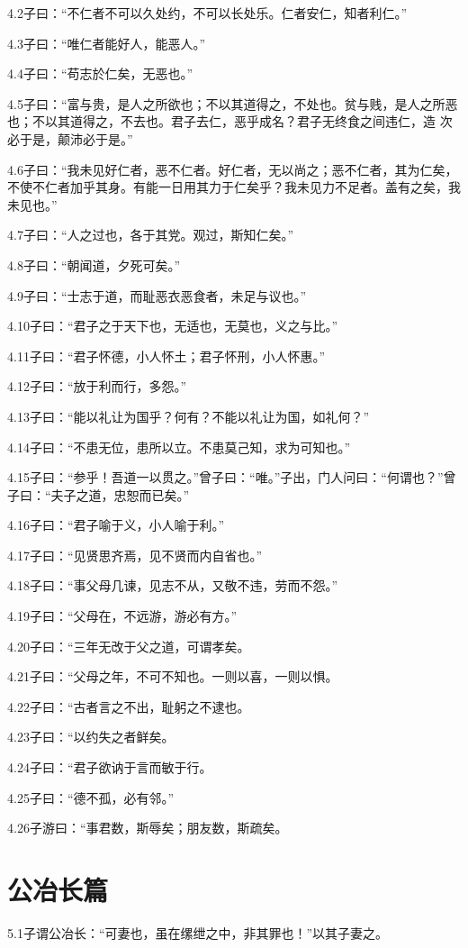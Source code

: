 \documentclass[a4paper,12pt,UTF8,twoside]{ctexbook}
\begin{document}
4.2子曰：“不仁者不可以久处约，不可以长处乐。仁者安仁，知者利仁。”

4.3子曰：“唯仁者能好人，能恶人。”

4.4子曰：“苟志於仁矣，无恶也。”

4.5子曰：“富与贵，是人之所欲也；不以其道得之，不处也。贫与贱，是人之所恶也；不以其道得之，不去也。君子去仁，恶乎成名？君子无终食之间违仁，造
次必于是，颠沛必于是。”

4.6子曰：“我未见好仁者，恶不仁者。好仁者，无以尚之；恶不仁者，其为仁矣，不使不仁者加乎其身。有能一日用其力于仁矣乎？我未见力不足者。盖有之矣，我未见也。”

4.7子曰：“人之过也，各于其党。观过，斯知仁矣。”

4.8子曰：“朝闻道，夕死可矣。”

4.9子曰：“士志于道，而耻恶衣恶食者，未足与议也。”

4.10子曰：“君子之于天下也，无适也，无莫也，义之与比。”

4.11子曰：“君子怀德，小人怀土；君子怀刑，小人怀惠。”

4.12子曰：“放于利而行，多怨。”

4.13子曰：“能以礼让为国乎？何有？不能以礼让为国，如礼何？”

4.14子曰：“不患无位，患所以立。不患莫己知，求为可知也。”

4.15子曰：“参乎！吾道一以贯之。”曾子曰：“唯。”子出，门人问曰：“何谓也？”曾子曰：“夫子之道，忠恕而已矣。”

4.16子曰：“君子喻于义，小人喻于利。”

4.17子曰：“见贤思齐焉，见不贤而内自省也。”

4.18子曰：“事父母几谏，见志不从，又敬不违，劳而不怨。”

4.19子曰：“父母在，不远游，游必有方。”

4.20子曰：“三年无改于父之道，可谓孝矣。

4.21子曰：“父母之年，不可不知也。一则以喜，一则以惧。

4.22子曰：“古者言之不出，耻躬之不逮也。

4.23子曰：“以约失之者鲜矣。

4.24子曰：“君子欲讷于言而敏于行。

4.25子曰：“德不孤，必有邻。”

4.26子游曰：“事君数，斯辱矣；朋友数，斯疏矣。

\chapter{公冶长篇}
5.1子谓公冶长：“可妻也，虽在缧绁之中，非其罪也！”以其子妻之。
\end{document}
